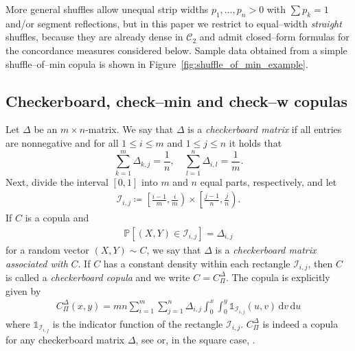 \documentclass{article}
\theoremstyle{definition}
\newcommand{\CC}{\mathcal{C}}  %
\newcommand{\II}{\mathcal{I}}  %
\newcommand{\Prob}{\mathbb{P}}  %
\def\1{\mathds{1}} %
\newcommand{\de}{\mathrm{\,d}}
\begin{document}
More general shuffles allow unequal strip widths $p_1,\dots,p_n>0$ with $\sum p_k=1$ and/or segment reflections, but in this paper we restrict to equal--width \emph{straight} shuffles, because they are already dense in $\CC_2$ and admit closed–form formulas for the concordance measures considered below.
Sample data obtained from a simple shuffle--of--min copula is shown in Figure~\ref{fig:shuffle_of_min_example}.

\subsection{Checkerboard, check--min and check--w copulas}
\label{subsec:delta_and_checkerboard_copulas}

Let $\Delta$ be an $m\times n$-matrix.
We say that $\Delta$ is a \emph{checkerboard matrix} if all entries are nonnegative and for all $1\leq i \leq m$ and $1\leq j \leq n$ it holds that
\[
    \sum_{k=1}^{m} \Delta_{k,j} = \frac1n,\quad \sum_{l=1}^{n} \Delta_{i,l} = \frac1m
.\]
Next, divide the interval \([0,1]\) into $m$ and $n$ equal parts, respectively, and let
\begin{align}\label{eq:checkerboard_rectangles}
    \II_{i, j}
    \coloneq \left[\frac{i-1}{m}, \frac{i}{m}\right) \times \left[\frac{j-1}{n}, \frac{j}{n}\right)
.\end{align}
If $C$ is a copula and
\begin{align}\label{eq:delta_copula}
    \Prob[(X,Y) \in \II_{i,j}] = \Delta_{i,j}
\end{align}
for a random vector $(X,Y)\sim C$, we say that $\Delta$ is a \textit{checkerboard matrix associated with} $C$.
If $C$ has a constant density within each rectangle $\II_{i,j}$, then $C$ is called a \emph{checkerboard copula} and we write $C=C^{\Delta}_{\Pi}$.
The copula is explicitly given by
\begin{align}\label{eq:checkerboard_copula}
    C^{\Delta}_{\Pi}(x,y) = mn\sum_{i=1}^{m} \sum_{j=1}^{n} \Delta_{i,j} \int_{0} ^x\int_0^y \1_{\II_{i,j}}(u,v) \de v \de u
\end{align}
where $\1_{\II_{i,j}}$ is the indicator function of the rectangle $\II_{i,j}$.
$C^{\Delta}_{\Pi}$ is indeed a copula for any checkerboard matrix $\Delta$, see \cite[Section 2]{kuzmenko2020checkerboard} or, in the square case, \cite[Theorem 2.2]{li1998strong}.
\end{document}
